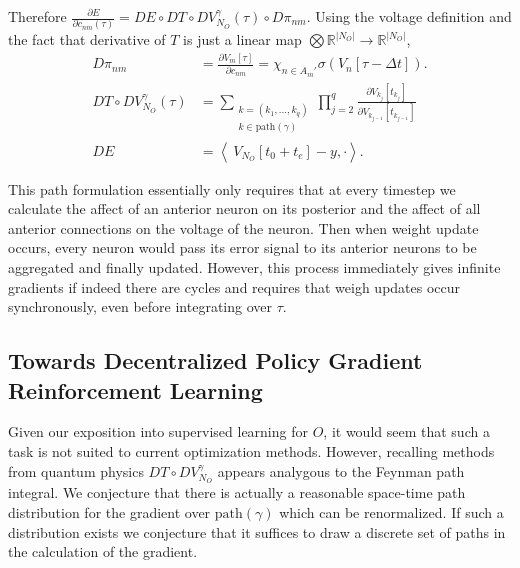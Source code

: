 	Therefore $\frac{\partial E}{\partial c_{nm}(\tau)} = DE \circ DT \circ DV_{N_O}^\gamma(\tau) \circ D\pi_{nm}$. Using the voltage definition and the fact that derivative of $T$ is just a linear map $\bigotimes \mathbb{R}^{|N_O|} \to \mathbb{R}^{|N_O|}$,
	\begin{equation}
		\begin{aligned}
			D\pi_{nm} &= \frac{\partial V_m[\tau]}{\partial c_{nm}} = \chi_{n \in A_m'} \sigma(V_n[\tau-\Delta t]). \\
			DT\circ DV^{\gamma}_{N_O}(\tau)
				&= \sum_{
					\substack{
						k = (k_1, \dots, k_q)\\
						k \in \text{path}(\gamma)
					}} 
				\prod_{j=2}^{q}
				 	\frac{\partial V_{k_j}[t_{k_j}]}{\partial V_{k_{j-1}}[t_{k_{j-1}}]} \\
				 	DE &= \left\langle\ V_{N_O}[t_0 + t_e] - y, \cdot \right\rangle. 
		\end{aligned}
	\end{equation}

	This path formulation essentially only requires that at every timestep we calculate the affect of an anterior neuron on its posterior and the affect of all anterior connections on the voltage of the neuron.  Then when weight update occurs, every neuron would pass its error signal to its anterior neurons to be aggregated and finally updated. However, this process immediately gives infinite gradients if indeed there are cycles and requires that weigh updates occur synchronously, even before integrating over $\tau.$

\subsection{Towards Decentralized Policy Gradient Reinforcement Learning}

	Given our exposition into supervised learning for $O$, it would seem that such a task is not suited to current optimization methods. However, recalling methods from quantum physics $DT \circ DV^\gamma_{N_O}$ appears analygous to the Feynman path integral. We conjecture that there is actually a reasonable space-time path distribution for the gradient over $\text{path}(\gamma)$ which can be renormalized. If such a distribution exists we conjecture that it suffices to draw a discrete set of paths in the calculation of the gradient.



